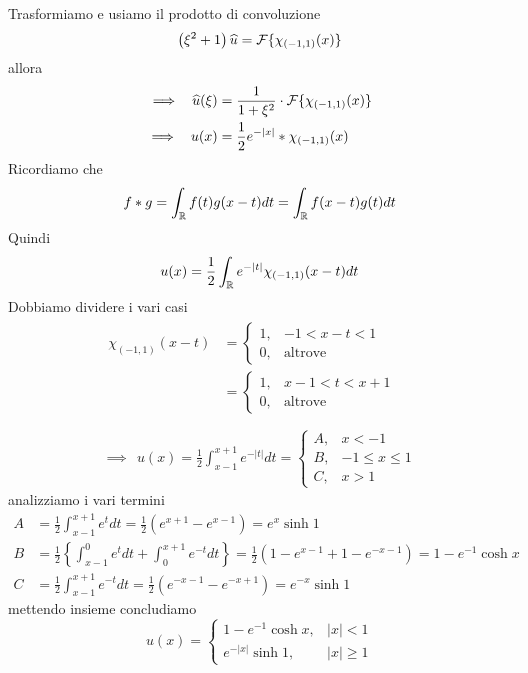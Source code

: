 Trasformiamo e usiamo il prodotto di convoluzione
\begin{equation*}
\left(\xi^{2} + 1\right)\widehat{u} = \mathcal{F} \{\chi_{(- 1, 1)}(x)\}
\end{equation*}
allora
\begin{align*}
\implies \ \ \widehat{u}(\xi) & = \frac{1}{1 + \xi^{2}} \cdot \mathcal{F} \{\chi_{(- 1, 1)}(x)\}\\
\implies \ \ u(x) & = \frac{1}{2} e^{- | x|} *\chi_{(- 1, 1)}(x)
\end{align*}
Ricordiamo che
\begin{equation*}
f*g = \int_{\mathbb{R}} f(t) g(x - t) dt = \int_{\mathbb{R}} f(x - t) g(t) dt
\end{equation*}
Quindi
\begin{equation*}
u(x) = \frac{1}{2}\int_{\mathbb{R}} e^{- | t|} \chi_{(- 1, 1)}(x - t) dt
\end{equation*}
Dobbiamo dividere i vari casi
\begin{gather*}
\begin{aligned}
\chi_{(- 1, 1)}(x - t) & =
\begin{cases}
1, & - 1 < x - t < 1\\
0, & \text{altrove}
\end{cases}\\
 & =
\begin{cases}
1, & x - 1 < t < x + 1\\
0, & \text{altrove}
\end{cases}
\end{aligned}\\
\\
\implies \ \ u(x) = \frac{1}{2}\int^{x + 1}_{x - 1} e^{- | t|} dt =
\begin{cases}
A, & x < - 1\\
B, & - 1 \leq x \leq 1\\
C, & x > 1
\end{cases}
\end{gather*}
analizziamo i vari termini
\begin{align*}
A & = \frac{1}{2}\int^{x + 1}_{x - 1} e^{t} dt = \frac{1}{2}\left(e^{x + 1} - e^{x - 1}\right) = e^{x}\sinh 1\\
B & = \frac{1}{2}\left\{\int^{0}_{x - 1} e^{t} dt + \int^{x + 1}_{0} e^{- t} dt\right\} = \frac{1}{2}\left(1 - e^{x - 1} + 1 - e^{- x - 1}\right) = 1 - e^{- 1}\cosh x\\
C & = \frac{1}{2}\int^{x + 1}_{x - 1} e^{- t} dt = \frac{1}{2}\left(e^{- x - 1} - e^{- x + 1}\right) = e^{- x}\sinh 1
\end{align*}
mettendo insieme concludiamo
\begin{equation*}
u(x) =
\begin{cases}
1 - e^{- 1}\cosh x, & | x| < 1\\
e^{- | x|}\sinh 1, & | x| \geq 1
\end{cases}
\end{equation*}

